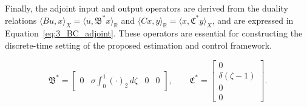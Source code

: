 Finally, the adjoint input and output operators are derived from the duality relations $\langle Bu, x \rangle_X = \langle u, \mathfrak{B}^* x \rangle_\mathbb{R}$ and $\langle Cx, y \rangle_\mathbb{R} = \langle x, \mathfrak{C}^* y \rangle_X$, and are expressed in Equation~\eqref{eq:3_BC_adjoint}. These operators are essential for constructing the discrete-time setting of the proposed estimation and control framework.

\begin{equation} \label{eq:3_BC_adjoint}
\mathfrak{B}^* = \begin{bmatrix} 0 & \sigma \int_0^1 (\cdot)_2\, d\zeta & 0 & 0 \end{bmatrix}, \qquad
\mathfrak{C}^* = \begin{bmatrix} 0 \\ \delta(\zeta - 1) \\ 0 \\ 0 \end{bmatrix}.
\end{equation}